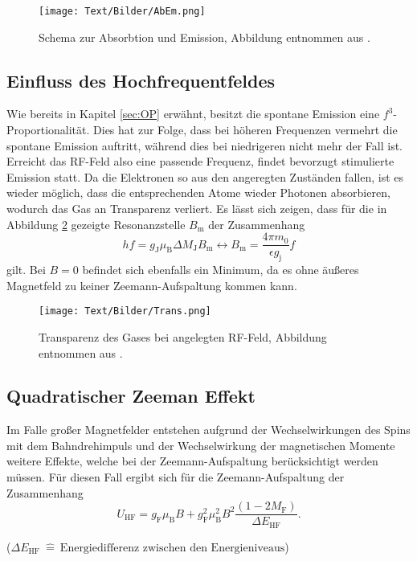 \begin{figure}[H]
  \centering
  \texttt{[image: Text/Bilder/AbEm.png]}
  \caption{Schema zur Absorbtion und Emission, Abbildung entnommen aus \cite{AbEm}.}
  \label{fig:AbEm}
\end{figure}


\subsection{Einfluss des Hochfrequentfeldes}
Wie bereits in Kapitel \ref{sec:OP} erwähnt, besitzt die spontane Emission eine $f^3$-Proportionalität. Dies hat zur Folge, dass bei höheren Frequenzen vermehrt die spontane Emission auftritt, während dies bei niedrigeren nicht mehr der Fall ist. Erreicht das RF-Feld also eine passende Frequenz, findet bevorzugt stimulierte Emission statt. Da die Elektronen so aus den angeregten Zuständen fallen, ist es wieder möglich, dass die entsprechenden Atome wieder Photonen absorbieren, wodurch das Gas an Transparenz verliert.
Es lässt sich zeigen, dass für die in Abbildung \ref{fig:Trans} gezeigte Resonanzstelle $B_\text{m}$ der Zusammenhang
\begin{equation}
  hf=g_\text{J}\mu_\text{B} \Delta M_\text{J} B_\text{m} \leftrightarrow B_\text{m} = \frac{4 \pi m_0}{\epsilon g_\text{j}} f \label{eq:B_m}
\end{equation}
gilt. Bei $B=0$ befindet sich ebenfalls ein Minimum, da es ohne äußeres Magnetfeld zu keiner Zeemann-Aufspaltung kommen kann.

\begin{figure}[H]
  \centering
  \texttt{[image: Text/Bilder/Trans.png]}
  \caption{Transparenz des Gases bei angelegten RF-Feld, Abbildung entnommen aus \cite{sample}.}
  \label{fig:Trans}
\end{figure}

\subsection{Quadratischer Zeeman Effekt}
Im Falle großer Magnetfelder entstehen aufgrund der Wechselwirkungen des Spins mit dem Bahndrehimpuls und der Wechselwirkung der magnetischen Momente weitere Effekte, welche bei der Zeemann-Aufspaltung berücksichtigt werden müssen.
Für diesen Fall ergibt sich für die Zeemann-Aufspaltung der Zusammenhang
\begin{equation}
  U_\text{HF} = g_\text{F} \mu_\text{B} B + g^2_\text{F} \mu^2_\text{B} B^2 \frac{\left( 1 - 2 M_\text{F} \right)}{\Delta E_\text{HF}} \label{eq:??}.
\end{equation}

\begin{center}
  \tiny {($ \Delta E_\text{HF} \: \hat{=} \: \text{Energiedifferenz zwischen den Energieniveaus}$)}
\end{center}
